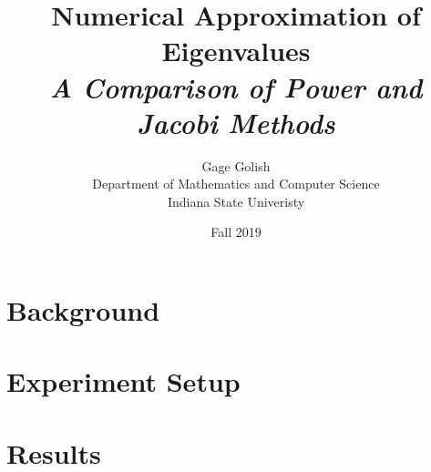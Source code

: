 \documentclass[12pt]{article}
\title{
  \textbf{Numerical Approximation of Eigenvalues}\\
  \Large \textit{A Comparison of Power and Jacobi Methods}
}
\author{
  Gage Golish\\
  Department of Mathematics and Computer Science\\
  Indiana State Univeristy
}
\date{Fall 2019}
\begin{document}
\maketitle
\thispagestyle{empty}

\pagebreak

\tableofcontents

\pagebreak

\section{Background} 
\section{Experiment Setup} 
\section{Results}
\end{document}
